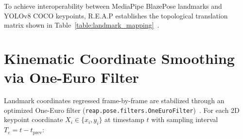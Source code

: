 \documentclass[12pt]{report}
\begin{document}
To achieve interoperability between MediaPipe BlazePose landmarks and YOLOv8 COCO keypoints, R.E.A.P establishes the topological translation matrix shown in Table~\ref{table:landmark_mapping}~\cite{bazarevsky2020blazepose, maji2022yolopose}.

\begin{table}[htbp]
    \centering
    \caption{Keypoint Mapping from MediaPipe BlazePose to COCO}
    \label{table:landmark_mapping}
    \footnotesize
\end{table}

\newpage
\section{Kinematic Coordinate Smoothing via One-Euro Filter}
Landmark coordinates regressed frame-by-frame are stabilized through an optimized One-Euro filter (\texttt{reap.pose.}\allowbreak\texttt{filters.}\allowbreak\texttt{OneEuroFilter})~\cite{casiez2012euro}. For each 2D keypoint coordinate $X_i \in \{x_i, y_i\}$ at timestamp $t$ with sampling interval $T_e = t - t_{\text{prev}}$:
\end{document}
